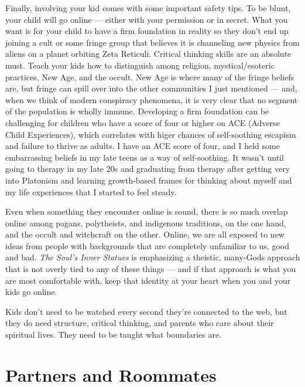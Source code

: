 \documentclass[
]{book}
\begin{document}
Finally, involving your kid comes with some important safety tips. To be blunt, your child will go online --- either with your permission or in secret. What you want is for your child to have a firm foundation in reality so they don't end up joining a cult or some fringe group that believes it is channeling new physics from aliens on a planet orbiting Zeta Reticuli. Critical thinking skills are an absolute must. Teach your kids how to distinguish among religion, mystical/esoteric practices, New Age, and the occult. New Age is where many of the fringe beliefs are, but fringe can spill over into the other communities I just mentioned --- and, when we think of modern conspiracy phenomena, it is very clear that no segment of the population is wholly immune. Developing a firm foundation can be challenging for children who have a score of four or higher on ACE (Adverse Child Experiences), which correlates with higer chances of self-soothing escapism and failure to thrive as adults. I have an ACE score of four, and I held some embarrassing beliefs in my late teens as a way of self-soothing. It wasn't until going to therapy in my late 20s and graduating from therapy after getting very into Platonism and learning growth-based frames for thinking about myself and my life experiences that I started to feel steady.

Even when something they encounter online is sound, there is so much overlap online among pagans, polytheists, and indigenous traditions, on the one hand, and the occult and witchcraft on the other. Online, we are all exposed to new ideas from people with backgrounds that are completely unfamiliar to us, good and bad. \emph{The Soul's Inner Statues} is emphasizing a theistic, many-Gods approach that is not overly tied to any of these things --- and if that approach is what you are most comfortable with, keep that identity at your heart when you and your kids go online.

Kids don't need to be watched every second they're connected to the web, but they do need structure, critical thinking, and parents who care about their spiritual lives. They need to be taught what boundaries are.

\hypertarget{partners-and-roommates}{%
\section{Partners and Roommates}\label{partners-and-roommates}}
\end{document}
